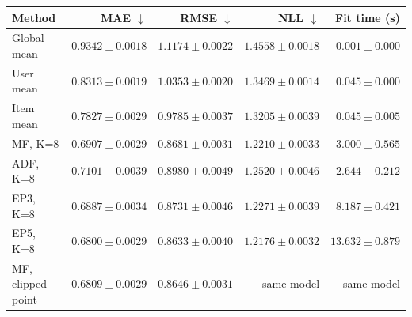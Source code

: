 \begin{tabular}{lrrrr}
\toprule
Method & MAE $\downarrow$ & RMSE $\downarrow$ & NLL $\downarrow$ & Fit time (s) \\
\midrule
Global mean & $0.9342\pm0.0018$ & $1.1174\pm0.0022$ & $1.4558\pm0.0018$ & $0.001\pm0.000$ \\
User mean & $0.8313\pm0.0019$ & $1.0353\pm0.0020$ & $1.3469\pm0.0014$ & $0.045\pm0.000$ \\
Item mean & $0.7827\pm0.0029$ & $0.9785\pm0.0037$ & $1.3205\pm0.0039$ & $0.045\pm0.005$ \\
MF, K=8 & $0.6907\pm0.0029$ & $0.8681\pm0.0031$ & $1.2210\pm0.0033$ & $3.000\pm0.565$ \\
ADF, K=8 & $0.7101\pm0.0039$ & $0.8980\pm0.0049$ & $1.2520\pm0.0046$ & $2.644\pm0.212$ \\
EP3, K=8 & $0.6887\pm0.0034$ & $0.8731\pm0.0046$ & $1.2271\pm0.0039$ & $8.187\pm0.421$ \\
EP5, K=8 & $0.6800\pm0.0029$ & $0.8633\pm0.0040$ & $1.2176\pm0.0032$ & $13.632\pm0.879$ \\
\midrule
MF, clipped point & $0.6809\pm0.0029$ & $0.8646\pm0.0031$ & same model & same model \\
\bottomrule
\end{tabular}
